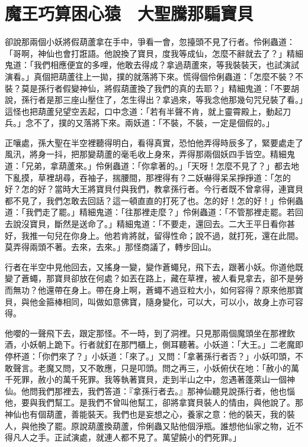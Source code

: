 
\chapter{魔王巧算困心猿　大聖騰那騙寶貝}

卻說那兩個小妖將假葫蘆拿在手中，爭看一會，忽擡頭不見了行者。伶俐蟲道：「哥啊，神仙也會打誑語。他說換了寶貝，度我等成仙，怎麼不辭就去了？」精細鬼道：「我們相應便宜的多哩，他敢去得成？拿過葫蘆來，等我裝裝天，也試演試演看。」真個把葫蘆往上一拋，撲的就落將下來。慌得個伶俐蟲道：「怎麼不裝？不裝？莫是孫行者假變神仙，將假葫蘆換了我們的真的去耶？」精細鬼道：「不要胡說，孫行者是那三座山壓住了，怎生得出？拿過來，等我念他那幾句咒兒裝了看。」這怪也把葫蘆兒望空丟起，口中念道：「若有半聲不肯，就上靈霄殿上，動起刀兵。」念不了，撲的又落將下來。兩妖道：「不裝，不裝，一定是個假的。」

正嚷處，孫大聖在半空裡聽得明白，看得真實，恐怕他弄得時辰多了，緊要處走了風汛，將身一抖，把那變葫蘆的毫毛收上身來，弄得那兩個妖四手皆空。精細鬼道：「兄弟，拿葫蘆來。」伶俐蟲道：「你拿著的。」「天呀！怎麼不見了？」都去地下亂摸，草裡胡尋，吞袖子，揣腰間，那裡得有？二妖嚇得呆呆掙掙道：「怎的好？怎的好？當時大王將寶貝付與我們，教拿孫行者。今行者既不曾拿得，連寶貝都不見了，我們怎敢去回話？這一頓直直的打死了也。怎的好！怎的好！」伶俐蟲道：「我們走了罷。」精細鬼道：「往那裡走麼？」伶俐蟲道：「不管那裡走罷。若回去說沒寶貝，斷然是送命了。」精細鬼道：「不要走，還回去。二大王平日看你甚好，我推一句兒在你身上。他若肯將就，留得性命；說不過，就打死，還在此間。莫弄得兩頭不著。去來，去來。」那怪商議了，轉步回山。

行者在半空中見他回去，又搖身一變，變作蒼蠅兒，飛下去，跟著小妖。你道他既變了蒼蠅，那寶貝卻放在何處？如丟在路上，藏在草裡，被人看見拿去，卻不是勞而無功？他還帶在身上。帶在身上啊，蒼蠅不過豆粒大小，如何容得？原來他那寶貝，與他金箍棒相同，叫做如意佛寶，隨身變化，可以大，可以小，故身上亦可容得。

他嚶的一聲飛下去，跟定那怪。不一時，到了洞裡。只見那兩個魔頭坐在那裡飲酒，小妖朝上跪下。行者就釘在那門櫃上，側耳聽著。小妖道：「大王。」二老魔即停杯道：「你們來了？」小妖道：「來了。」又問：「拿著孫行者否？」小妖叩頭，不敢聲言。老魔又問，又不敢應，只是叩頭。問之再三，小妖俯伏在地：「赦小的萬千死罪，赦小的萬千死罪。我等執著寶貝，走到半山之中，忽遇著蓬萊山一個神仙。他問我們那裡去，我們答道：『拿孫行者去。』那神仙聽見說孫行者，他也惱他，要與我們幫工。是我們不曾叫他幫工，卻將拿寶貝裝人的情由，與他說了。那神仙也有個葫蘆，善能裝天。我們也是妄想之心，養家之意：他的裝天，我的裝人，與他換了罷。原說葫蘆換葫蘆，伶俐蟲又貼他個淨瓶。誰想他仙家之物，近不得凡人之手。正試演處，就連人都不見了。萬望饒小的們死罪。」

